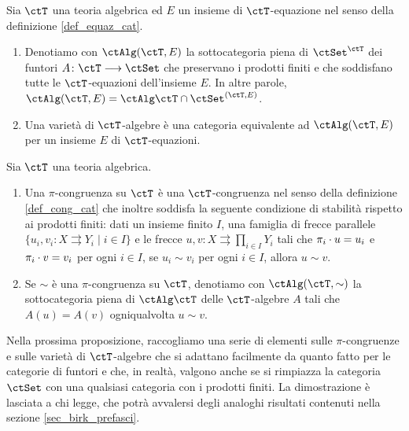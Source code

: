 \begin{definition}\label{def_var_TAlg}
 Sia \(\ctT\) una teoria algebrica ed \(E\) un insieme di \(\ctT\)-equazione nel senso della definizione \ref{def_equaz_cat}.
 \begin{enumerate}
  \item Denotiamo con \(\ctAlg(\ctT,E)\) la sottocategoria piena di \(\ctSet^\ctT\) dei funtori \(A \colon \ctT \fun \ctSet\) che
        preservano i prodotti finiti e che soddisfano tutte le \(\ctT\)-equazioni dell'insieme \(E\). In altre parole,
        \(\ctAlg(\ctT,E) = \ctAlg\ctT \cap \ctSet^{(\ctT,E)}\).
  \item Una varietà di \(\ctT\)-algebre è una categoria equivalente ad \(\ctAlg(\ctT,E)\) per un insieme \(E\) di \(\ctT\)-equazioni.
 \end{enumerate}
\end{definition}

\begin{definition}\label{def_pcong}
 Sia \(\ctT\) una teoria algebrica.
 \begin{enumerate}
  \item Una \(\pi\)-congruenza su \(\ctT\) è una \(\ctT\)-congruenza nel senso della definizione
        \ref{def_cong_cat} che inoltre soddisfa la seguente condizione di stabilità rispetto ai prodotti finiti: dati un insieme finito \(I\), una
        famiglia di frecce parallele \(\{u_i, v_i \colon X \rightrightarrows Y_i \mid i  \in I\}\) e le frecce \(u,v \colon X \rightrightarrows \prod_{i \in I} Y_i\)
        tali che \(\pi_i \cdot u = u_i\) e \(\pi_i \cdot v = v_i\) per ogni \(i \in I\), se \(u_i \sim v_i\) per ogni \(i \in I\), allora \(u \sim v\).
  \item Se \(\sim\) è una \(\pi\)-congruenza su \(\ctT\), denotiamo con \(\ctAlg(\ctT,\sim)\) la sottocategoria piena di \(\ctAlg\ctT\)
        delle \(\ctT\)-algebre \(A\) tali che \(A(u)=A(v)\) ogniqualvolta \(u \sim v\).
 \end{enumerate}
\end{definition}

Nella prossima proposizione, raccogliamo una serie di elementi sulle \(\pi\)-congruenze e sulle varietà di \(\ctT\)-algebre
che si adattano facilmente da quanto fatto per le categorie di funtori e che, in realtà, valgono anche se si rimpiazza
la categoria \(\ctSet\) con una qualsiasi categoria con i prodotti finiti. La dimostrazione è lasciata a chi legge, che potrà
avvalersi degli analoghi risultati contenuti nella sezione \ref{sec_birk_prefasci}.


